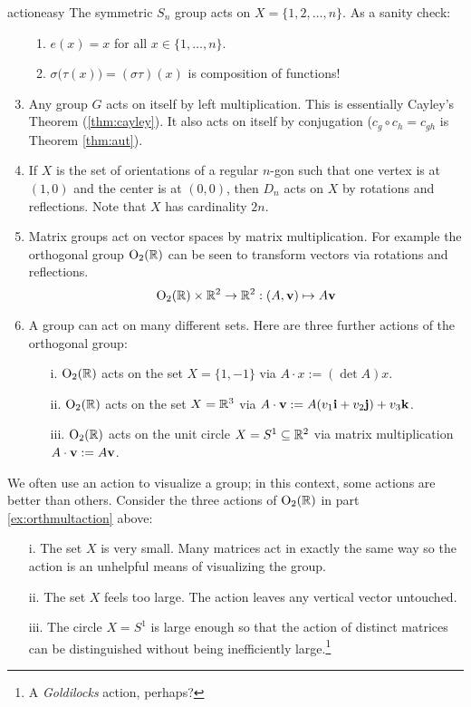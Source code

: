 \begin{examples}{}{actioneasy}
\exstart The symmetric $S_n$ group acts on $X=\{1,2,\ldots,n\}$. As a sanity check:\vspace{-3pt}
\begin{enumerate}\setcounter{enumi}{1}
  \item[]\begin{enumerate}
		\item $e(x)=x$ for all $x\in \{1,\ldots,n\}$.
		\item $\sigma\bigl(\tau(x)\bigr)=(\sigma\tau)(x)$ is composition of functions!
	\end{enumerate}
  \item Any group $G$ acts on itself by left multiplication. This is essentially Cayley's Theorem (\ref{thm:cayley}). It also acts on itself by conjugation ($c_g\circ c_h=c_{gh}$ is Theorem \ref{thm:aut}).
  \item If $X$ is the set of orientations of a regular $n$-gon such that one vertex is at $(1,0)$ and the center is at $(0,0)$, then $D_n$ acts on $X$ by rotations and reflections. Note that $X$ has cardinality $2n$.
  \item Matrix groups act on vector spaces by matrix multiplication. For example the orthogonal group $\mathrm{O}_2(\mathbb{R})$ can be seen to transform vectors via rotations and reflections.
	\[\mathrm{O}_2(\mathbb{R})\times\mathbb{R}^2\to\mathbb{R}^2:(A,{\mathbf{v}})\mapsto A{\mathbf{v}}\]
  
  \item\label{ex:orthmultaction} A group can act on many different sets. Here are three further actions of the orthogonal group:
	\begin{enumerate}
  	\item[i.] $\mathrm{O}_2(\mathbb{R})$ acts on the set $X=\{1,-1\}$ via $A\cdot x:=(\det A)x$.
		\item[ii.] $\mathrm{O}_2(\mathbb{R})$ acts on the set $X=\mathbb{R}^3$ via $A\cdot{\mathbf{v}}:=A(v_1{\mathbf{i}}+v_2{\mathbf{j}})+v_3{\mathbf{k}}$.
		\item[iii.] $\mathrm{O}_2(\mathbb{R})$ acts on the unit circle $X=S^1\subseteq\mathbb{R}^2$ via matrix multiplication $A\cdot{\mathbf{v}}:=A{\mathbf{v}}$.
	\end{enumerate}
\end{enumerate}
\end{examples}

We often use an action to visualize a group; in this context, some actions are better than others. Consider the three actions of $\mathrm{O}_2(\mathbb{R})$ in part \ref*{ex:orthmultaction} above:
\begin{enumerate}\itemsep0pt
  \item[i.] The set $X$ is very small. Many matrices act in exactly the same way so the action is an unhelpful means of visualizing the group.
	\item[ii.] The set $X$ feels too large. The action leaves any vertical vector untouched.
	\item[iii.] The circle $X=S^1$ is large enough so that the action of distinct matrices can be distinguished without being inefficiently large.\footnote{A \emph{Goldilocks} action, perhaps?}
\end{enumerate}


